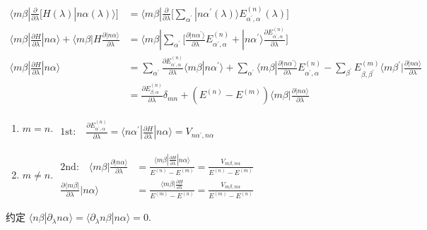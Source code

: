 \documentclass[../../main.tex]{subfiles}
\begin{document}
\begin{align*}
    \langle m\beta|\frac{\partial}{\partial\lambda}\bigg[H(\lambda)|n\alpha(\lambda)\rangle\bigg] &= \langle m\beta|\frac{\partial}{\partial\lambda}\bigg[\sum_{\alpha^{\prime}}|n\alpha^{\prime}(\lambda)\rangle E^{(n)}_{\alpha^{\prime},\alpha}(\lambda)\bigg]\\
    \langle m\beta|\frac{\partial H}{\partial\lambda}|n\alpha\rangle  + \langle m\beta|H\frac{\partial|n\alpha\rangle}{\partial\lambda} &= \langle m\beta|\sum_{\alpha^{\prime}}\bigg[\frac{\partial|n\alpha^{\prime}\rangle}{\partial\lambda}E_{\alpha^{\prime},\alpha}^{(n)} + |n\alpha^{\prime}\rangle\frac{\partial E_{\alpha^{\prime},\alpha}^{(n)}}{\partial\lambda}\bigg] \\
    \langle m\beta|\frac{\partial H}{\partial\lambda}|n\alpha\rangle &= \sum_{\alpha^{\prime}}\frac{\partial E^{(n)}_{\alpha^{\prime},\alpha}}{\partial\lambda} \langle m\beta|n\alpha^{\prime}\rangle + \sum_{\alpha^{\prime}}\langle m\beta|\frac{\partial|n\alpha^{\prime}\rangle}{\partial\lambda}E^{(n)}_{\alpha^{\prime},\alpha} - \sum_{\beta^{\prime}}E^{(m)}_{\beta,\beta^{\prime}}\langle m\beta^{\prime}|\frac{\partial|n\alpha\rangle}{\partial\lambda}\\
    &= \frac{\partial E^{(n)}_{\beta,\alpha}}{\partial\lambda}\delta_{mn} + (E^{(n)}-E^{(m)})\langle m\beta|\frac{\partial |n\alpha\rangle}{\partial\lambda}
\end{align*}
\begin{enumerate}
    \item $m=n$. $\begin{aligned}
        \text{1st:}\quad \frac{\partial E^{(n)}_{\alpha^{\prime},\alpha}}{\partial\lambda} = \langle n\alpha^{\prime}|\frac{\partial H}{\partial\lambda}|n\alpha\rangle = V_{n\alpha^{\prime},n\alpha}
    \end{aligned}$
    \item $m\neq n$. $\begin{aligned}
        \text{2nd:}\quad\langle m\beta|\frac{\partial |n\alpha\rangle}{\partial\lambda} &= \frac{\langle m\beta|\frac{\partial H}{\partial\lambda}|n\alpha\rangle}{E^{(n)}-E^{(m)}} = \frac{V_{m\beta,n\alpha}}{E^{(n)}-E^{(m)}}\\
        \frac{\partial\langle m\beta|}{\partial\lambda}|n\alpha\rangle &= \frac{\langle m\beta|\frac{\partial H}{\partial\lambda}}{E^{(m)}-E^{(n)}} = \frac{V_{m\beta,n\alpha}}{E^{(m)}-E^{(n)}}
    \end{aligned}$
\end{enumerate}
约定 $\langle n\beta|\partial_{\lambda}n\alpha\rangle = \langle \partial_{\lambda}n\beta|n\alpha\rangle = 0$.
\end{document}
